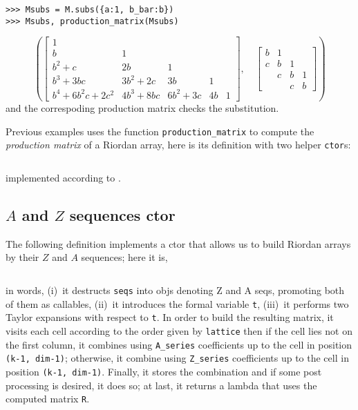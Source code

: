 \begin{example}
\begin{verbatim}
>>> Msubs = M.subs({a:1, b_bar:b})
>>> Msubs, production_matrix(Msubs)
\end{verbatim}
\begin{displaymath}
\left ( \left[\begin{matrix}1 &   &   &   &  \\b & 1 &   &   &  \\b^{2} + c & 2 b & 1 &   &  \\b^{3} + 3 b c & 3 b^{2} + 2 c & 3 b & 1 &  \\b^{4} + 6 b^{2} c + 2 c^{2} & 4 b^{3} + 8 b c & 6 b^{2} + 3 c & 4 b & 1\end{matrix}\right], \quad \left[\begin{matrix}b & 1 &   &  \\c & b & 1 &  \\  & c & b & 1\\  &   & c & b\end{matrix}\right]\right )
\end{displaymath}
and the correspoding production matrix checks the substitution.
\end{example}

Previous examples uses the function \verb|production_matrix| to compute the
\textit{production matrix} \citep{DEUTSCH2005101,Deutsch2009} of a Riordan
array, here is its definition with two helper \verb|ctor|s:

\inputminted[baselinestretch=0.8,stripnl=false,firstline=159, lastline=180]{python}{deps/simulation-methods/src/sequences.py}

\noindent implemented according to \citep[page~$215$]{barry2017riordan}.

\subsection{$A$ and $Z$ sequences ctor}

The following definition implements a ctor that allows us to build Riordan
arrays by their $Z$ and $A$ sequences; here it is,
\inputminted[baselinestretch=0.8,stripnl=false,firstline=47, lastline=78]
    {python}{deps/simulation-methods/src/sequences.py}
in words, (i)~it destructs \verb|seqs| into objs denoting Z and A seqs,
promoting both of them as callables, (ii)~it introduces the formal variable \verb|t|,
(iii)~it performs two Taylor expansions with respect to \verb|t|.
In order to build the resulting matrix, it
visits each cell according to the order given by \verb|lattice| then
if the cell lies not on the first column, it combines using \verb|A_series| coefficients
up to the cell in position \verb|(k-1, dim-1)|;
otherwise, %
it combine using \verb|Z_series| coefficients up to the cell in position
\verb|(k-1, dim-1)|. Finally, it stores the combination and
if some post processing is desired, it does so; at last,
it returns a lambda that uses the computed matrix \verb|R|.

